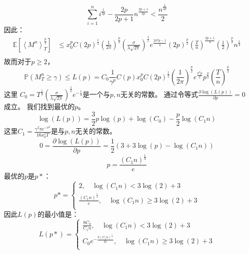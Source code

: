  \begin{equation}
 \sum_{i=1}^{n}i^{\frac{1}{2p}}-\frac{2p}{2p+1}n^{\frac{2p+1}{2p}}<\frac{n^{\frac{1}{2p}}}{2}
 \end{equation}
 因此：
 \begin{equation}
 \begin{split}
 \mathbb{E}[\left \langle M^n \right \rangle_T^{\frac{p}{2}}]
 &\leq x_0^pC(2p)^{\frac{1}{2}}(\frac{1}{2\pi})^{\frac{p}{2}}(\frac{\sigma}{\lambda\sqrt{2\pi}})^{\frac{1}{2}}e^{\frac{2\sigma^2p-1}{4}}
 (2p)^{\frac{p}{2}}(\frac{T}{n})^{\frac{2p+1}{4}}(\frac{1}{2})^{\frac{p}{2}}n^{\frac{1}{4}}\\
 \end{split}
 \end{equation}
 故而对于$p\geq 2$，
 \begin{equation}
 \mathbb{P}(M_T^n\geq \gamma)\leq L(p)=C_0\frac{1}{\gamma^p}C(p)x_0^pC(2p)^{\frac{1}{2}}(\frac{1}{2\pi})^{\frac{p}{2}}e^{\frac{\sigma^2p}{2}}
 p^{\frac{p}{2}}(\frac{T}{n})^{\frac{p}{2}}
 \end{equation}
 这里
 $C_0=T^{\frac{1}{4}}(\frac{\sigma}{\lambda\sqrt{2\pi}})^{\frac{1}{2}}e^{-\frac{1}{4}}$是一个与$p, n$无关的常数。  
 通过令等式$\frac{\partial \log(L(p))}{\partial p}=0$成立。 我们找到最优的$p$。
 \begin{equation}
 \log(L(p))=\frac{3}{2}p\log(p)+\log(C_0)-\frac{p}{2}\log(C_1n)
 \end{equation}
 这里$C_1=\frac{\gamma^2\pi e^{-\sigma^2}}{16x_0^2T}$是与$p, n$无关的常数。
 \begin{equation}
 0=\frac{\partial\log(L(p))}{\partial p}=\frac{1}{2}(3+3\log(p)-\log(C_1n)) 
 \end{equation}
 \begin{equation}
 p=\frac{(C_1n)^{\frac{1}{3}}}{e}
 \end{equation}
 最优的$p$是$p*$：
 \begin{equation}
 p*=
 \begin{cases}
 2, \quad  \log(C_1n)<3\log(2)+3\\
 \frac{(C_1n)^{\frac{1}{3}}}{e}, \quad \log(C_1n)\geq 3\log(2)+3\\
 \end{cases}
 \end{equation}
 因此$L(p)$的最小值是：
 \begin{equation}
 L(p*)=
 \begin{cases}
 \frac{8C_0}{C_1n}, \quad \log(C_1n)<3\log(2)+3\\
 C_0e^{-\frac{3(C_1n)^{\frac{1}{3}}}{2e}}, \quad \log(C_1n)\geq 3\log(2)+3\\
 \end{cases}
 \end{equation}
